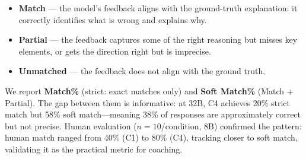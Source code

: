 \documentclass{article} %
\begin{document}
\begin{itemize}[itemsep=1pt, topsep=2pt]
  \item \textbf{Match} --- the model's feedback aligns with the ground-truth explanation: it correctly identifies what is wrong and explains why.
  \item \textbf{Partial} --- the feedback captures some of the right reasoning but misses key elements, or gets the direction right but is imprecise.
  \item \textbf{Unmatched} --- the feedback does not align with the ground truth.
\end{itemize}

\noindent We report \textbf{Match\%} (strict: exact matches only) and \textbf{Soft Match\%} (Match + Partial). The gap between them is informative: at 32B, C4 achieves 20\% strict match but 58\% soft match---meaning 38\% of responses are approximately correct but not precise. Human evaluation ($n{=}10$/condition, 8B) confirmed the pattern: human match ranged from 40\% (C1) to 80\% (C4), tracking closer to soft match, validating it as the practical metric for coaching.
\end{document}
